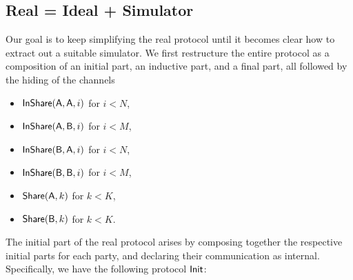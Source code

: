\subsection{Real = Ideal + Simulator}
Our goal is to keep simplifying the real protocol until it becomes clear how to extract out a suitable simulator. We first restructure the entire protocol as a composition of an initial part, an inductive part, and a final part, all followed by the hiding of the channels
\begin{itemize}
\item $\mathsf{InShare}(\mathsf{A},\mathsf{A},i)$ for $i < N$,
\item $\mathsf{InShare}(\mathsf{A},\mathsf{B},i)$ for $i < M$,
\item $\mathsf{InShare}(\mathsf{B},\mathsf{A},i)$ for $i < N$,
\item $\mathsf{InShare}(\mathsf{B},\mathsf{B},i)$ for $i < M$,
\item $\mathsf{Share}(\mathsf{A},k)$ for $k < K$,
\item $\mathsf{Share}(\mathsf{B},k)$ for $k < K$.
\end{itemize}

\noindent The initial part of the real protocol arises by composing together the respective initial parts for each party, and declaring their communication as internal. Specifically, we have the following protocol $\mathsf{Init}$:

